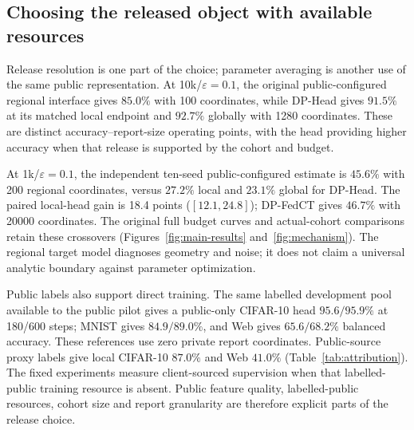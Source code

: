 \subsection{Choosing the released object with available resources}
\label{sec:scale}

Release resolution is one part of the choice; parameter averaging is another
use of the same public representation. At 10k/$\varepsilon=0.1$, the original
public-configured regional interface gives $85.0\%$ with 100 coordinates,
while DP-Head gives $91.5\%$ at its matched local endpoint and $92.7\%$ globally
with 1280 coordinates. These are distinct accuracy--report-size operating
points, with the head providing higher accuracy when that release is supported
by the cohort and budget.

At 1k/$\varepsilon=0.1$, the independent ten-seed public-configured estimate
is $45.6\%$ with 200 regional coordinates, versus $27.2\%$ local and
$23.1\%$ global for DP-Head. The paired local-head gain is 18.4 points
($[12.1,24.8]$); DP-FedCT gives $46.7\%$ with 20000 coordinates.
The original full budget curves and actual-cohort comparisons retain these
crossovers (Figures~\ref{fig:main-results} and~\ref{fig:mechanism}).
The regional target model diagnoses geometry and noise; it does not claim a
universal analytic boundary against parameter optimization.



Public labels also support direct training. The same labelled development
pool available to the public pilot gives a public-only CIFAR-10 head
$95.6/95.9\%$ at 180/600 steps; MNIST gives $84.9/89.0\%$, and Web gives
$65.6/68.2\%$ balanced accuracy. These references use zero private report
coordinates. Public-source proxy labels give local CIFAR-10 $87.0\%$ and
Web $41.0\%$ (Table~\ref{tab:attribution}). The fixed experiments measure
client-sourced supervision when that labelled-public training resource is
absent. Public feature quality, labelled-public resources, cohort size and
report granularity are therefore explicit parts of the release choice.
